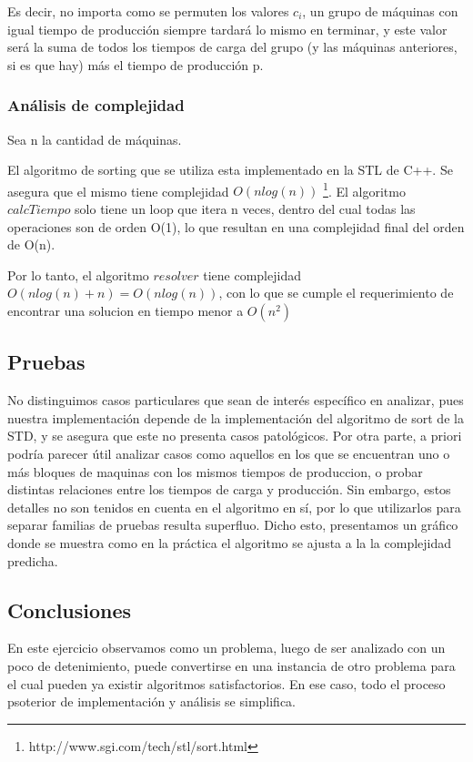 Es decir, no importa como se permuten los valores $c_i$, un grupo de m\'aquinas con igual tiempo de producci\'on siempre tardar\'a lo mismo en terminar, y este valor ser\'a la suma de todos los tiempos de carga del grupo (y las m\'aquinas anteriores, si es que hay) m\'as el tiempo de producci\'on p.
 

\subsubsection{An\'alisis de complejidad}
 
 Sea n la cantidad de m\'aquinas.
 
 El algoritmo de sorting que se utiliza esta implementado en la STL de C++. Se asegura que el mismo tiene complejidad $O(n log(n))$ \footnote{http://www.sgi.com/tech/stl/sort.html}.
 El algoritmo $calcTiempo$ solo tiene un loop que itera n veces, dentro del cual todas las operaciones son de orden O(1), lo que resultan en una complejidad final del orden de O(n).
 
Por lo tanto, el algoritmo $resolver$ tiene complejidad $O(n log(n) + n) = O(n log(n))$, con lo que se cumple el requerimiento de encontrar una solucion en tiempo menor a $O(n^2)$

\subsection{Pruebas}
No distinguimos casos particulares que sean de inter\'es espec\'ifico en analizar, pues nuestra implementaci\'on depende de la implementaci\'on del algoritmo de sort de la STD, y se asegura que este no presenta casos patol\'ogicos.
Por otra parte, a priori podr\'ia parecer \'util analizar casos como aquellos en los que se encuentran  uno o m\'as bloques de maquinas con los mismos tiempos de produccion, o probar distintas relaciones entre los tiempos de carga y producci\'on. Sin embargo, estos detalles no son tenidos en cuenta en el algoritmo en s\'i, por lo que utilizarlos para separar familias de pruebas resulta superfluo.
Dicho esto, presentamos un gr\'afico donde se muestra como en la pr\'actica el algoritmo se ajusta a la la complejidad predicha.


\begin{figure}[H]
	\centering
	\caption{ }
\end{figure}


\subsection{Conclusiones}
En este ejercicio observamos como un problema, luego de ser analizado con un poco de detenimiento, puede convertirse en una instancia de otro problema para el cual pueden ya existir algoritmos satisfactorios. En ese caso, todo el proceso psoterior de implementaci\'on y an\'alisis se simplifica.